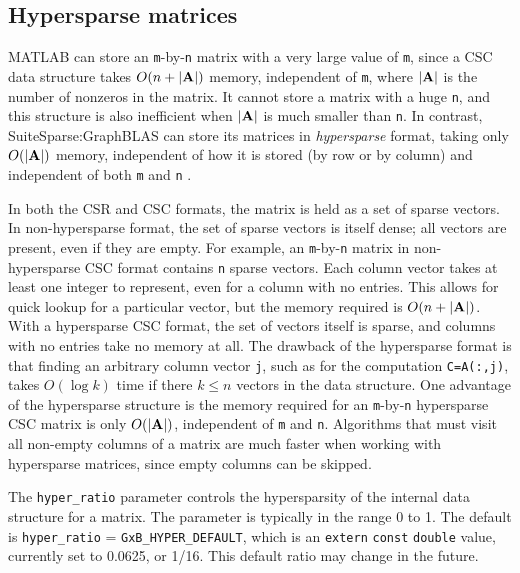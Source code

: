 \documentclass[12pt]{article}
\begin{document}
\subsection{Hypersparse matrices}
\label{hypersparse}

MATLAB can store an \verb'm'-by-\verb'n' matrix with a very large value of
\verb'm', since a CSC data structure takes $O(n+|{\bf A}|)$ memory, independent
of \verb'm', where $|{\bf A}|$ is the number of nonzeros in the matrix.  It
cannot store a matrix with a huge \verb'n', and this structure is also
inefficient when $|{\bf A}|$ is much smaller than \verb'n'.  In contrast,
SuiteSparse:GraphBLAS can store its matrices in {\em hypersparse} format,
taking only $O(|{\bf A}|)$ memory, independent of how it is stored (by row or
by column) and independent of both \verb'm' and \verb'n'
\cite{BulucGilbert08,BulucGilbert12}.

In both the CSR and CSC formats, the matrix is held as a set of sparse vectors.
In non-hypersparse format, the set of sparse vectors is itself dense; all
vectors are present, even if they are empty.  For example, an
\verb'm'-by-\verb'n' matrix in non-hypersparse CSC format contains \verb'n'
sparse vectors.  Each column vector takes at least one integer to represent,
even for a column with no entries.  This allows for quick lookup for a
particular vector, but the memory required is $O(n+|{\bf A}|)$.  With a
hypersparse CSC format, the set of vectors itself is sparse, and columns with
no entries take no memory at all.  The drawback of the hypersparse format is
that finding an arbitrary column vector \verb'j', such as for the computation
\verb'C=A(:,j)', takes $O(\log k)$ time if there $k \le n$ vectors in the data
structure.  One advantage of the hypersparse structure is the memory required
for an \verb'm'-by-\verb'n' hypersparse CSC matrix is only $O(|{\bf A}|)$,
independent of \verb'm' and \verb'n'.  Algorithms that must visit all non-empty
columns of a matrix are much faster when working with hypersparse matrices,
since empty columns can be skipped.

The \verb'hyper_ratio' parameter controls the hypersparsity of the internal
data structure for a matrix.  The parameter is typically in the range 0 to 1.
The default is \verb'hyper_ratio' = \verb'GxB_HYPER_DEFAULT', which is an
\verb'extern' \verb'const' \verb'double' value, currently set to 0.0625, or
1/16.  This default ratio may change in the future.
\end{document}
